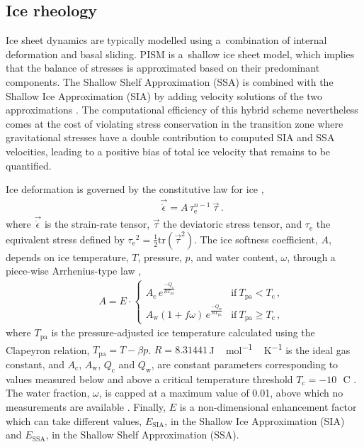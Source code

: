 \documentclass[tc, manuscript]{copernicus}
\begin{document}
\subsection{Ice rheology}
\label{sec:icedyn}

      Ice sheet dynamics are typically modelled using a~combination of
      internal deformation and basal sliding. PISM is a~shallow ice sheet
      model, which implies that the balance of stresses is approximated
      based on their predominant components. The Shallow Shelf Approximation
      (SSA) is combined with the Shallow Ice Approximation
      (SIA) by adding velocity solutions of the two approximations
      \citep[Eqs.~7--9 and 15]{Winkelmann.etal.2011}. The computational
      efficiency of this hybrid scheme nevertheless comes at the cost of
      violating stress conservation in the transition zone where
      gravitational stresses have a double contribution to computed SIA and
      SSA velocities, leading to a positive bias of total ice velocity that
      remains to be quantified.

      Ice deformation is governed by the constitutive law for ice
      \citep{Glen.1952, Nye.1953},
%
\begin{align}
&\label{eqn:glenslaw}
&\vec{\dot{\epsilon}} = A\,\tau_{\mathrm{e}}^{n-1}\,\vec{\tau} \,.
\end{align}
%
      where $\vec{\dot{\epsilon}}$ is the strain-rate tensor,
      $\vec{\tau}$ the deviatoric stress tensor, and $\tau_{\mathrm{e}}$ the
      equivalent stress defined by ${\tau_{\mathrm{e}}}^2 = \frac{1}{2}
      \mathrm{tr}(\vec{\tau}^2)$. The ice softness coefficient, $A$, depends
      on ice temperature, $T$, pressure, $p$, and water content, $\omega$,
      through a piece-wise Arrhenius-type law
      \citep[Eqs.~63--65]{Aschwanden.etal.2012},
%
\begin{align}
&\label{eqn:softness}
&A = E\cdot
\begin{cases}
A_{\mathrm{c}} \,e^\frac{-Q_{\mathrm{c}}}{RT_{\text{pa}}}            & \text{if}\ T_{\text{pa}}  <  T_{\mathrm{c}} \,, \\
A_{\mathrm{w}} (1+f\omega)\,e^\frac{-Q_{\mathrm{w}}}{RT_{\text{pa}}} & \text{if}\ T_{\text{pa}} \ge T_{\mathrm{c}} \,,
\end{cases}
\end{align}
%
      where $T_{\text{pa}}$ is the pressure-adjusted ice temperature
      calculated using the Clapeyron relation, ${T_{\text{pa}} = T - \beta
      p}$. $R=8.31441$\,\unit{J\,mol^{-1}\,K^{-1}} is the ideal gas
      constant, and $A_{\mathrm{c}}$, $A_{\mathrm{w}}$, $Q_{\mathrm{c}}$ and
      $Q_{\mathrm{w}}$, are constant parameters corresponding to values
      measured below and above a critical temperature threshold
      $T_{\mathrm{c}}=-10$\,\unit{{\degree}C}
      \citep[p.~72]{Paterson.Budd.1982,Cuffey.Paterson.2010}. The water
      fraction, $\omega$, is capped at a maximum value of 0.01, above which
      no measurements are available \citep[Eq.~5.7]{Lliboutry.Duval.1985,
      Greve.1997}. Finally, $E$ is a non-dimensional enhancement factor
      which can take different values, $E_{\text{SIA}}$, in the Shallow Ice
      Approximation (SIA) and $E_{\text{SSA}}$, in the Shallow Shelf
      Approximation (SSA).
\end{document}
